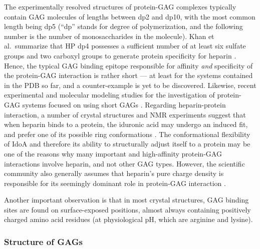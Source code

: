 The experimentally resolved structures of protein-GAG complexes typically
contain GAG molecules of lengths between dp2 and dp10, with the most common
length being dp5 (\enquote{dp} stands for degree of polymerization, and the
following number is the number of monosaccharides in the molecule). Khan et al.\
summarize that HP dp4 possesses a sufficient number of at least six sulfate
groups and two carboxyl groups to generate protein specificity for heparin
\cite{semi_rigid_heparin_structures_2010}. Hence, the typical GAG binding
epitope responsible for affinity \textit{and} specificity of the protein-GAG
interaction is rather short --- at least for the systems contained in the PDB so
far, and a counter-example is yet to be discovered. Likewise, recent
experimental and molecular modeling studies for the investigation of protein-GAG
systems focused on using short GAGs \cite{pichert_characterization_2012,
hintze_sergey_2014, gandhi_coombe_2008, Gandhi01102009,
mancera_gandhi_jcim_2011, agostino_mancera_gandhi_2014}. Regarding
heparin-protein interaction, a number of crystal structures and NMR experiments
suggest that when heparin binds to a protein, the iduronic acid may undergo an
induced fit, and prefer one of its possible ring conformations
\cite{gandhi_structure_2008}. The conformational flexibility of IdoA and
therefore its ability to structurally adjust itself to a protein may be one of
the reasons why many important and high-affinity protein-GAG interactions
involve heparin, and not other GAG types. However, the scientific community also
generally assumes that heparin's pure charge density is responsible for its
seemingly dominant role in protein-GAG interaction \cite{gandhi_structure_2008,
essentials_glycobiology_protgags_2009}.

Another important observation is that in most crystal structures, GAG binding
sites are found on surface-exposed positions, almost always containing
positively charged amino acid residues (at physiological pH, which are arginine
and lysine).

\subsubsection{Structure of GAGs}

